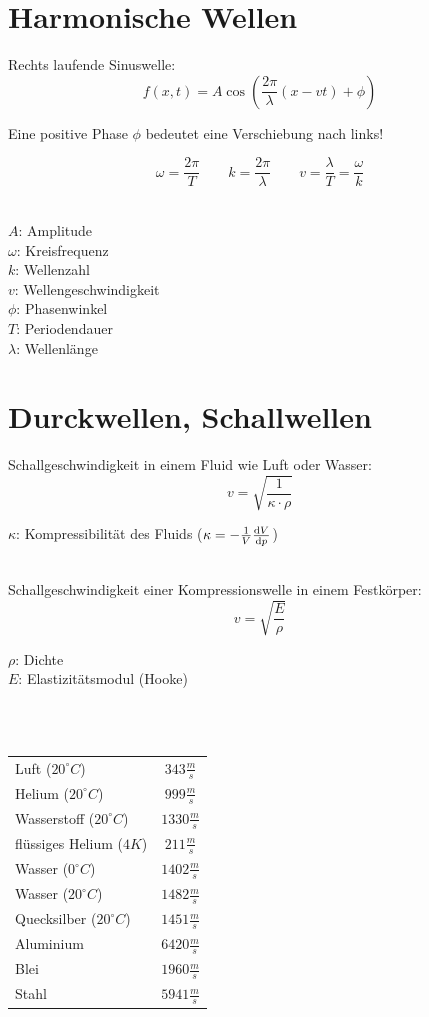 \section{Harmonische Wellen}
Rechts laufende Sinuswelle:
\[\boxed{
	f(x,t) = A\cos \left( \frac{2\pi}{\lambda} (x-vt)+\phi \right)
}\]
\begin{footnotesize}
	Eine positive Phase $\phi$ bedeutet eine Verschiebung nach links!
\end{footnotesize}
\[\boxed{
	\omega = \frac{2\pi}{T} \qquad k = \frac{2\pi}{\lambda} \qquad v = \frac{\lambda}{T} = \frac{\omega}{k}
}\]
\\
\begin{footnotesize}
	$A$: Amplitude\\
	$\omega$: Kreisfrequenz\\
	$k$: Wellenzahl\\
	$v$: Wellengeschwindigkeit\\
	$\phi$: Phasenwinkel\\
	$T$: Periodendauer\\
	$\lambda$: Wellenlänge
\end{footnotesize}


\section{Durckwellen, Schallwellen}
Schallgeschwindigkeit in einem Fluid wie Luft oder Wasser:
\[\boxed{
	v = \sqrt{\frac{1}{\kappa \cdot \rho}}
}\]
\begin{footnotesize}
	$\kappa$: Kompressibilität des Fluids ($\kappa=-\frac{1}{V} \frac{\mathrm{d} V}{\mathrm{d} p}$)
\end{footnotesize}
\\
Schallgeschwindigkeit einer Kompressionswelle in einem Festkörper:
\[\boxed{
	v = \sqrt{\frac{E}{\rho}}
}\]
\begin{footnotesize}
	$\rho$: Dichte\\
	$E$: Elastizitätsmodul (Hooke)
\end{footnotesize}

~\\\\
\begin{tabular}{|lc|}
\hline
\rowcolor{white}Luft  ($20^\circ C$) 		& $343 \frac{m}{s}$ \\ 
\rowcolor{lgray}Helium  ($20^\circ C$) 		& $999 \frac{m}{s}$ \\ 
\rowcolor{white}Wasserstoff  ($20^\circ C$) & $1330 \frac{m}{s}$ \\ 
\rowcolor{lgray}flüssiges Helium ($4K$) 	& $211 \frac{m}{s}$ \\ 
\rowcolor{white}Wasser  ($0^\circ C$) 		& $1402 \frac{m}{s}$ \\ 
\rowcolor{lgray}Wasser  ($20^\circ C$) 		& $1482 \frac{m}{s}$ \\ 
\rowcolor{white}Quecksilber  ($20^\circ C$) & $1451 \frac{m}{s}$ \\ 
\rowcolor{lgray}Aluminium 					& $6420 \frac{m}{s}$ \\ 
\rowcolor{white}Blei 						& $1960 \frac{m}{s}$ \\ 
\rowcolor{lgray}Stahl 						& $5941 \frac{m}{s}$ \\ 
\hline
\end{tabular} 


